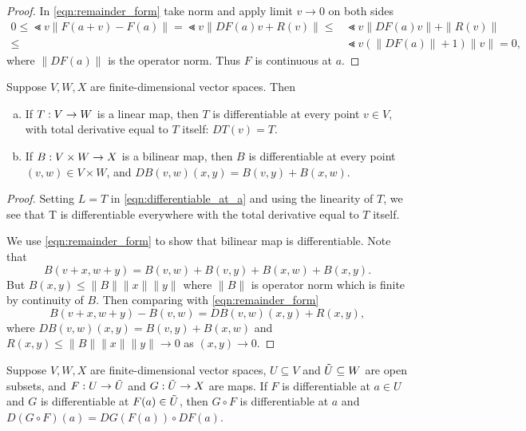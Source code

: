 \documentclass[11pt,a4paper]{article}
\begin{document}
\begin{proof}
In \eqref{eqn:remainder_form} take norm and apply limit $v\rightarrow 0$ on both sides 
\begin{align*}
0\le\Lt{v} \|F(a+v) - F(a)\| = \Lt{v} \|DF(a)v+R(v)\| 
\le& \Lt{v} \|DF(a)v\| + \|R(v)\| \\
\le& \Lt{v} (\|DF(a)\|+1)\|v\| = 0,
\end{align*}
where $\|DF(a)\|$ is the operator norm. Thus $F$ is continuous at $a$.
\end{proof}

\begin{proposition}
Suppose $V,W,X$ are finite-dimensional vector spaces. Then 
\begin{enumerate}[(a)]
    \item If $T:V\rightarrow W$ is a linear map, then $T$ is differentiable at every point $v\in V$, with total derivative equal to $T$ itself: $DT(v) = T$.
    \item If $B:V\times W\rightarrow X$ is a bilinear map, then $B$ is differentiable at every point $(v,w)\in V\times W$, and $DB(v,w)(x,y) = B(v,y)+B(x,w)$.
\end{enumerate}
\end{proposition}

\begin{proof}
 Setting $L = T$ in \eqref{eqn:differentiable_at_a} and using the linearity of $T$, we see that T is differentiable everywhere with the total derivative equal to $T$ itself.

 We use \eqref{eqn:remainder_form} to show that bilinear map is differentiable. Note that 
\begin{equation*}
    B(v+x,w+y) = B(v,w) + B(v,y) + B(x,w) + B(x,y).
\end{equation*}
But $B(x,y)\le \|B\|\|x\|\|y\|$ where $\|B\|$ is operator norm which is finite by continuity of $B$. Then comparing with \eqref{eqn:remainder_form}
\begin{equation*}
    B(v+x,w+y) - B(v,w) = DB(v,w)(x,y) + R(x,y),
\end{equation*}
where $DB(v,w)(x,y) = B(v,y) + B(x,w)$ and $R(x,y) \le \|B\|\|x\|\|y\|\rightarrow 0$ as $(x,y)\rightarrow 0$.
\end{proof}

\begin{proposition} \label{prop:chain_rule_total_derivatives}
Suppose $V,W,X$ are finite-dimensional vector spaces, $U\subseteq V$ and $\Tilde{U}\subseteq W$ are open subsets, and $F:U\rightarrow \Tilde{U}$ and $G:\Tilde{U}\rightarrow X$ are maps. If $F$ is differentiable at $a\in U$ and $G$ is differentiable at $F(a)\in \Tilde{U}$, then $G\circ F$ is differentiable at $a$ and $D(G\circ F)(a) = DG(F(a))\circ DF(a)$.
\end{proposition}
\end{document}
